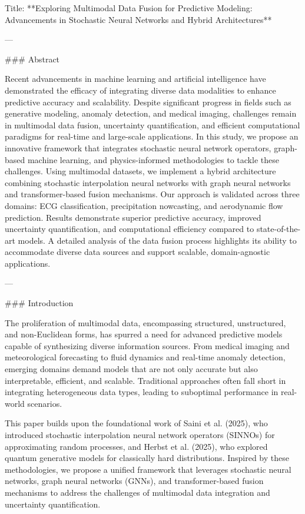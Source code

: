 Title: **Exploring Multimodal Data Fusion for Predictive Modeling: Advancements in Stochastic Neural Networks and Hybrid Architectures**

---

### Abstract

Recent advancements in machine learning and artificial intelligence have demonstrated the efficacy of integrating diverse data modalities to enhance predictive accuracy and scalability. Despite significant progress in fields such as generative modeling, anomaly detection, and medical imaging, challenges remain in multimodal data fusion, uncertainty quantification, and efficient computational paradigms for real-time and large-scale applications. In this study, we propose an innovative framework that integrates stochastic neural network operators, graph-based machine learning, and physics-informed methodologies to tackle these challenges. Using multimodal datasets, we implement a hybrid architecture combining stochastic interpolation neural networks with graph neural networks and transformer-based fusion mechanisms. Our approach is validated across three domains: ECG classification, precipitation nowcasting, and aerodynamic flow prediction. Results demonstrate superior predictive accuracy, improved uncertainty quantification, and computational efficiency compared to state-of-the-art models. A detailed analysis of the data fusion process highlights its ability to accommodate diverse data sources and support scalable, domain-agnostic applications.

---

### Introduction

The proliferation of multimodal data, encompassing structured, unstructured, and non-Euclidean forms, has spurred a need for advanced predictive models capable of synthesizing diverse information sources. From medical imaging and meteorological forecasting to fluid dynamics and real-time anomaly detection, emerging domains demand models that are not only accurate but also interpretable, efficient, and scalable. Traditional approaches often fall short in integrating heterogeneous data types, leading to suboptimal performance in real-world scenarios.

This paper builds upon the foundational work of Saini et al. (2025), who introduced stochastic interpolation neural network operators (SINNOs) for approximating random processes, and Herbst et al. (2025), who explored quantum generative models for classically hard distributions. Inspired by these methodologies, we propose a unified framework that leverages stochastic neural networks, graph neural networks (GNNs), and transformer-based fusion mechanisms to address the challenges of multimodal data integration and uncertainty quantification.

